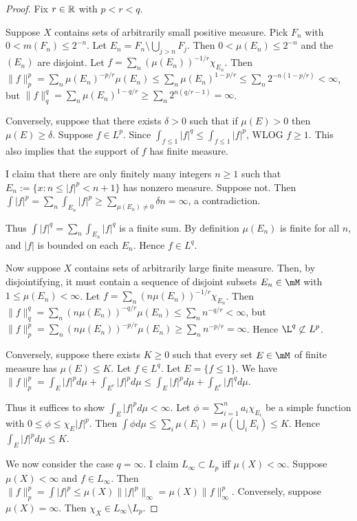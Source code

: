 \documentclass{article}
\begin{document}
\begin{proof}
Fix $r \in \mathbb{R}$ with $p < r < q$.

Suppose $X$ contains sets of arbitrarily small positive measure. Pick $F_n$ with $0 < m(F_n) \le 2^{-n}$.  Let $E_n = F_n \setminus \bigcup_{j > n} F_j$. Then $0 < \mu(E_n) \le 2^{-n}$ and the $(E_n)$ are disjoint.  Let $f = \sum_n (\mu(E_n))^{-1/r} \chi_{E_n}$.  Then $\|f\|_p^p = \sum_n \mu(E_n)^{-p/r} \mu(E_n) \le \sum_n \mu(E_n)^{1-p/r} \le \sum_n 2^{-n(1-p/r)} < \infty$, but $\|f\|_q^q = \sum_n \mu(E_n)^{1-q/r} \ge \sum_n 2^{n(q/r - 1)} = \infty$.

Conversely, suppose that there exists $\delta > 0$ such that if $\mu(E) > 0$ then $\mu(E) \ge \delta$. Suppose $f \in L^p$. Since $\int_{f \le 1} |f|^q \le \int_{f \le 1} |f|^p$, WLOG $f \ge 1$.  This also implies that the support of $f$ has finite measure. 

I claim that there are only finitely many integers $n \ge 1$ such that $E_n := \{x : n \le |f|^p < n+1\}$ has nonzero measure. Suppose not. Then $\int |f|^p = \sum_n \int_{E_n} |f|^p \ge \sum_{\mu(E_n) \neq 0} \delta n = \infty$, a contradiction.

Thus $\int |f|^q = \sum_n \int_{E_n} |f|^q$ is a finite sum.  By definition $\mu(E_n)$ is finite for all $n$, and $|f|$ is bounded on each $E_n$.  Hence $f \in L^q$.

Now suppose $X$ contains sets of arbitrarily large finite measure.  Then, by disjointifying, it must contain a sequence of disjoint subsets $E_n \in \mM$ with $1 \le \mu(E_n) < \infty$. Let $f = \sum_n (n \mu(E_n))^{-1/r} \chi_{E_n}$.  Then $\|f\|_q^q = \sum_n (n \mu(E_n))^{-q/r} \mu(E_n) \le \sum_n n^{-q/r} < \infty$, but $\|f\|_p^p = \sum_n (n \mu(E_n))^{-p/r} \mu(E_n) \ge \sum_n n^{-p/r} = \infty$.  Hence $\L^q \not \subset L^p$.

Conversely, suppose there exists $K \ge 0$ such that every set $E \in \mM$ of finite measure has $\mu(E) \le K$. Let $f \in L^q$.  Let $E = \{ f \le 1 \}$.  We have $\|f\|_p^p = \int_E |f|^p d\mu + \int_{E^c} |f|^p d\mu \le \int_E |f|^p d\mu + \int_{E^c} |f|^q d\mu$.

Thus it suffices to show $\int_E |f|^p d\mu < \infty$. Let $\phi = \sum_{i=1}^n a_i \chi_{E_i}$ be a simple function with $0 \le \phi \le \chi_E |f|^p$. Then $\int \phi d\mu \le \sum_i \mu(E_i) = \mu(\bigcup_i E_i) \le K$.  Hence $\int_E |f|^p d\mu \le K$.

We now consider the case $q = \infty$. I claim $L_\infty \subset L_p$ iff $\mu(X) < \infty$. Suppose $\mu(X) < \infty$ and $f \in L_\infty$. Then $\|f\|_p^p = \int |f|^p \le \mu(X) \||f|^p\|_\infty = \mu(X) \|f\|_\infty^p$.  Conversely, suppose $\mu(X) = \infty$. Then $\chi_X \in L_\infty \setminus L_p$.
\end{proof}
\end{document}
